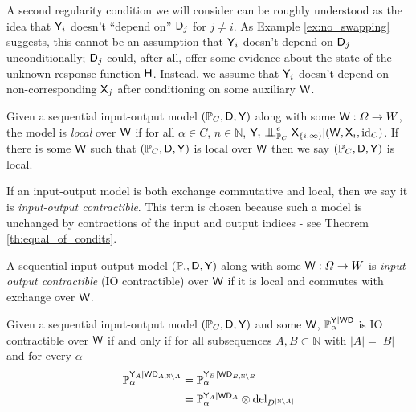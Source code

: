 A second regularity condition we will consider can be roughly understood as the idea that $\mathsf{Y}_i$ doesn't ``depend on'' $\mathsf{D}_j$ for $j\neq i$. As Example \ref{ex:no_swapping} suggests, this cannot be an assumption that $\mathsf{Y}_i$ doesn't depend on $\mathsf{D}_j$ unconditionally; $\mathsf{D}_j$ could, after all, offer some evidence about the state of the unknown response function $\mathsf{H}$. Instead, we assume that $\mathsf{Y}_i$ doesn't depend on non-corresponding $\mathsf{X}_j$ after conditioning on some auxiliary $\mathsf{W}$.

\begin{definition}[Locality]\label{def:caus_cont}
Given a sequential input-output model $(\mathbb{P}_C,\mathsf{D},\mathsf{Y})$ along with some $\mathsf{W}:\Omega\to W$, the model is \emph{local} over $\mathsf{W}$ if for all $\alpha\in C$, $n\in \mathbb{N}$, $\RV{Y}_i\CI^e_{\prob{P}_C} \RV{X}_{\{i,\infty)}|(\RV{W},\RV{X}_i,\text{id}_C)$. If there is some $\mathsf{W}$ such that $(\mathbb{P}_C,\mathsf{D},\mathsf{Y})$ is local over $\mathsf{W}$ then we say $(\mathbb{P}_C,\mathsf{D},\mathsf{Y})$ is local.
\end{definition}

If an input-output model is both exchange commutative and local, then we say it is \emph{input-output contractible}. This term is chosen because such a model is unchanged by contractions of the input and output indices - see Theorem \ref{th:equal_of_condits}.

\begin{definition}\label{def:ccontract}
A sequential input-output model $(\mathbb{P}_\cdot,\mathsf{D},\mathsf{Y})$ along with some $\mathsf{W}:\Omega\to W$ is \emph{input-output contractible} (IO contractible) over $\mathsf{W}$ if it is local and commutes with exchange over $\mathsf{W}$.
\end{definition}

\begin{theorem}\label{th:equal_of_condits}
Given a sequential input-output model $(\mathbb{P}_C,\mathsf{D},\mathsf{Y})$ and some $\mathsf{W}$, $\mathbb{P}_\alpha^{\mathsf{Y}|\mathsf{WD}}$ is IO contractible over $\mathsf{W}$ if and only if for all subsequences $A,B\subset \mathbb{N}$ with $|A|=|B|$ and for every $\alpha$
\begin{align}
    \mathbb{P}_\alpha^{\mathsf{Y}_A|\mathsf{WD}_{A,\mathbb{N}\setminus A}} &= \mathbb{P}_\alpha^{\mathsf{Y}_B|\mathsf{WD}_{B,\mathbb{N}\setminus B}}\\
    &= \mathbb{P}_\alpha^{\mathsf{Y}_A|\mathsf{WD}_A}\otimes \text{del}_{D^{|\mathbb{N}\setminus A|}}
\end{align}
\end{theorem}

